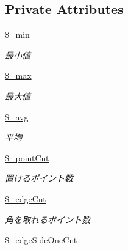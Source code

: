 \subsection*{Private Attributes}
\begin{DoxyCompactItemize}
\item 
\hyperlink{class_reversi_anz_ae268ad2868ae3e63e753d709ea83ff8c}{\$\+\_\+min}\hypertarget{class_reversi_anz_ae268ad2868ae3e63e753d709ea83ff8c}{}\label{class_reversi_anz_ae268ad2868ae3e63e753d709ea83ff8c}

\begin{DoxyCompactList}\small\item\em 最小値 \end{DoxyCompactList}\item 
\hyperlink{class_reversi_anz_a03d7199ef0a0f57557579b2c68c903fd}{\$\+\_\+max}\hypertarget{class_reversi_anz_a03d7199ef0a0f57557579b2c68c903fd}{}\label{class_reversi_anz_a03d7199ef0a0f57557579b2c68c903fd}

\begin{DoxyCompactList}\small\item\em 最大値 \end{DoxyCompactList}\item 
\hyperlink{class_reversi_anz_a7010adfa47d0c21665753ac9010fc86e}{\$\+\_\+avg}\hypertarget{class_reversi_anz_a7010adfa47d0c21665753ac9010fc86e}{}\label{class_reversi_anz_a7010adfa47d0c21665753ac9010fc86e}

\begin{DoxyCompactList}\small\item\em 平均 \end{DoxyCompactList}\item 
\hyperlink{class_reversi_anz_ac8c1f97213414e2aae74ab734086eba1}{\$\+\_\+point\+Cnt}\hypertarget{class_reversi_anz_ac8c1f97213414e2aae74ab734086eba1}{}\label{class_reversi_anz_ac8c1f97213414e2aae74ab734086eba1}

\begin{DoxyCompactList}\small\item\em 置けるポイント数 \end{DoxyCompactList}\item 
\hyperlink{class_reversi_anz_a276ec7259be48b6cfd5c3211661c71fe}{\$\+\_\+edge\+Cnt}\hypertarget{class_reversi_anz_a276ec7259be48b6cfd5c3211661c71fe}{}\label{class_reversi_anz_a276ec7259be48b6cfd5c3211661c71fe}

\begin{DoxyCompactList}\small\item\em 角を取れるポイント数 \end{DoxyCompactList}\item 
\hyperlink{class_reversi_anz_a471d69c419fa3fa86ee418063de71a55}{\$\+\_\+edge\+Side\+One\+Cnt}\hypertarget{class_reversi_anz_a471d69c419fa3fa86ee418063de71a55}{}\label{class_reversi_anz_a471d69c419fa3fa86ee418063de71a55}


\end{DoxyCompactItemize}

